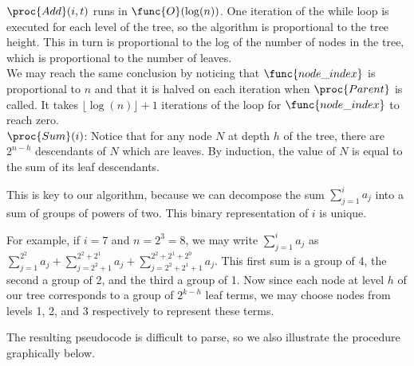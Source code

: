 \documentclass[11pt, answers]{exam}
\theoremstyle{plain}
\theoremstyle{definition}
\begin{document}
\begin{questions}
\begin{parts}
\begin{solution}
$\proc{Add}(i,t)$ runs in $\func{O}(\log(n))$. One iteration of the while loop is executed for each level of the tree, so the algorithm is proportional to the tree height. This in turn is proportional to the log of the number of nodes in the tree, which is proportional to the number of leaves. \\

We may reach the same conclusion by noticing that $\func{node\_index}$ is proportional to $n$ and that it is halved on each iteration when $\proc{Parent}$ is called. It takes $\lfloor \log(n) \rfloor + 1$ iterations of the loop for $\func{node\_index}$ to reach zero.
\\

$\proc{Sum}(i)$:
Notice that for any node $N$ at depth $h$ of the tree, there are $2^{n-h}$ descendants of $N$ which are leaves. By induction, the value of $N$ is equal to the sum of its leaf descendants. 

This is key to our algorithm, because we can decompose the sum $\sum_{j=1}^{i}a_j$ into a sum of groups of powers of two. This binary representation of $i$ is unique.

For example, if $i=7$ and $n=2^3=8$, we may write $\sum_{j=1}^{i}a_j$ as $\sum_{j=1}^{2^2}a_j +\sum_{j=2^2 + 1}^{2^2 + 2^1}a_j + \sum_{j=2^2 + 2^1 + 1}^{2^2 + 2^1 + 2^0}a_j$. This first sum is a group of 4, the second a group of 2, and the third a group of 1. Now since each node at level $h$ of our tree corresponds to a group of $2^{k-h}$ leaf terms, we may choose nodes from levels 1, 2, and 3 respectively to represent these terms.

The resulting pseudocode is difficult to parse, so we also illustrate the procedure graphically below. 

\begin{minipage}[t]{\linewidth}
                \centering
{}
\end{minipage}


\end{solution}
\end{parts}
\end{questions}
\end{document}
